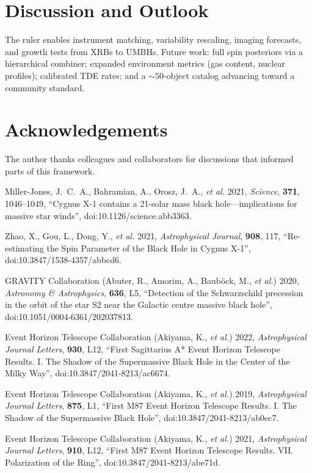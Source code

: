 \documentclass[11pt]{article}
\begin{document}
\section{Discussion and Outlook}
The ruler enables instrument matching, variability rescaling, imaging forecasts, and growth tests from XRBs to UMBHs. Future work: full spin posteriors via a hierarchical combiner; expanded environment metrics (gas content, nuclear profiles); calibrated TDE rates; and a $\sim 50$-object catalog advancing toward a community standard.

\section*{Acknowledgements}
The author thanks colleagues and collaborators for discussions that informed parts of this framework.


\begin{thebibliography}{99}

Miller-Jones, J.~C.~A., Bahramian, A., Orosz, J.~A., \emph{et al.} 2021,
\emph{Science}, \textbf{371}, 1046--1049,
``Cygnus X-1 contains a 21-solar mass black hole---implications for massive star winds'',
doi:10.1126/science.abb3363.

Zhao, X., Gou, L., Dong, Y., \emph{et al.} 2021,
\emph{Astrophysical Journal}, \textbf{908}, 117,
``Re-estimating the Spin Parameter of the Black Hole in Cygnus X-1'',
doi:10.3847/1538-4357/abbcd6.

GRAVITY Collaboration (Abuter, R., Amorim, A., Baub\"ock, M., \emph{et al.}) 2020,
\emph{Astronomy \& Astrophysics}, \textbf{636}, L5,
``Detection of the Schwarzschild precession in the orbit of the star S2 near the Galactic centre massive black hole'',
doi:10.1051/0004-6361/202037813.

Event Horizon Telescope Collaboration (Akiyama, K., \emph{et al.}) 2022,
\emph{Astrophysical Journal Letters}, \textbf{930}, L12,
``First Sagittarius A* Event Horizon Telescope Results. I. The Shadow of the Supermassive Black Hole in the Center of the Milky Way'',
doi:10.3847/2041-8213/ac6674.

Event Horizon Telescope Collaboration (Akiyama, K., \emph{et al.}) 2019,
\emph{Astrophysical Journal Letters}, \textbf{875}, L1,
``First M87 Event Horizon Telescope Results. I. The Shadow of the Supermassive Black Hole'',
doi:10.3847/2041-8213/ab0ec7.

Event Horizon Telescope Collaboration (Akiyama, K., \emph{et al.}) 2021,
\emph{Astrophysical Journal Letters}, \textbf{910}, L12,
``First M87 Event Horizon Telescope Results. VII. Polarization of the Ring'',
doi:10.3847/2041-8213/abe71d.

\end{thebibliography}
\end{document}
